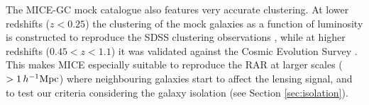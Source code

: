 \documentclass[usenatbib]{mnras}
\newcommand{\hMpc}{\, h^{-1}{\rm{Mpc}} }
\begin{document}
The MICE-GC mock catalogue also features very accurate clustering. At lower redshifts ($z<0.25$) the clustering of the mock galaxies as a function of luminosity is constructed to reproduce the SDSS clustering observations \cite[]{zehavi2011}, while at higher redshifts ($0.45<z<1.1$) it was validated against the Cosmic Evolution Survey \cite[COSMOS,][]{ilbert2009}. This makes MICE especially suitable to reproduce the RAR at larger scales ($>1\hMpc$)  where neighbouring galaxies start to affect the lensing signal, and to test our criteria considering the galaxy isolation (see Section \ref{sec:isolation}).




\end{document}
